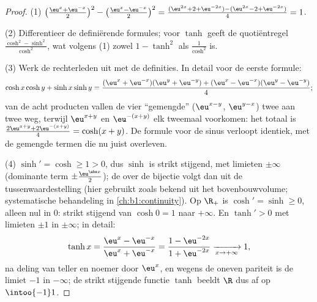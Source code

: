 \begin{proof}
(1) $\bigl(\frac{\eu^x + \eu^{-x}}{2}\bigr)^2 - \bigl(\frac{\eu^x -
\eu^{-x}}{2}\bigr)^2 = \frac{(\eu^{2x} + 2 + \eu^{-2x}) - (\eu^{2x} - 2 +
\eu^{-2x})}{4} = 1$.

(2) Differentieer de definiërende formules; voor $\tanh$ geeft de
quotiëntregel $\frac{\cosh^2 - \sinh^2}{\cosh^2}$, wat volgens (1) zowel
$1 - \tanh^2$ als $\frac{1}{\cosh^2}$ is.

(3) Werk de rechterleden uit met de definities. In detail voor de eerste
formule:
\[
\cosh x\cosh y + \sinh x\sinh y
= \frac{(\eu^x + \eu^{-x})(\eu^y + \eu^{-y})
+ (\eu^x - \eu^{-x})(\eu^y - \eu^{-y})}{4} ;
\]
van de acht producten vallen de vier ``gemengde'' ($\eu^{x-y}$,
$\eu^{y-x}$) twee aan twee weg, terwijl $\eu^{x+y}$ en $\eu^{-(x+y)}$
elk tweemaal voorkomen: het totaal is $\frac{2\eu^{x+y} +
2\eu^{-(x+y)}}{4} = \cosh(x+y)$. De formule voor de sinus verloopt
identiek, met de gemengde termen die nu juist overleven.

(4) $\sinh' = \cosh \geq 1 > 0$, dus $\sinh$ is strikt stijgend, met
limieten $\pm\infty$ (dominante term $\pm\frac{\eu^{\abs x}}{2}$); de
 over de bijectie volgt dan uit de tussenwaardestelling (hier
gebruikt zoals bekend uit het bovenbouwvolume; systematische behandeling
in \cref{ch:b1:continuity}). Op $\R_+$ is $\cosh' = \sinh \geq 0$, alleen
nul in $0$: strikt stijgend van $\cosh 0 = 1$ naar $+\infty$. En $\tanh'
> 0$ met limieten $\pm 1$ in $\pm\infty$; in detail:
\[
\tanh x = \frac{\eu^x - \eu^{-x}}{\eu^x + \eu^{-x}}
= \frac{1 - \eu^{-2x}}{1 + \eu^{-2x}}
\xrightarrow[x \to +\infty]{} 1 ,
\]
na deling van teller en noemer door $\eu^x$, en wegens de oneven
pariteit is de limiet $-1$ in $-\infty$; de strikt stijgende functie
$\tanh$ beeldt $\R$ dus af op $\intoo{-1}1$.
\end{proof}

